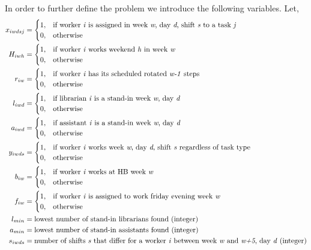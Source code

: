 In order to further define the problem we introduce the following variables. Let,
\begin{align}
    x_{iwdsj}&=
    \begin{cases}
      1, & \text{if worker \textit{i} is assigned in week \textit{w}, day \textit{d}, shift \textit{s} to a task \textit{j}}\\
      0, & \text{otherwise}
    \end{cases}
    \\
    H_{iwh}&=
    \begin{cases}
      1, & \text{if worker \textit{i} works weekend \textit{h} in week \textit{w}}\\
      0, & \text{otherwise}
    \end{cases}
	\\
	r_{iw}&=
	\begin{cases}
		1, & \text{if worker \textit{i} has its scheduled rotated \textit{w-1} steps}\\
		0, & \text{otherwise}
	\end{cases}
	\\
	l_{iwd}&=
	\begin{cases}
	  1, & \text{if librarian \textit{i} is a stand-in week \textit{w}, day \textit{d}} \\
	  0, & \text{otherwise}
	\end{cases}
	\\
	a_{iwd}&=
	\begin{cases}
 		1, & \text{if assistant \textit{i} is a stand-in week \textit{w}, day \textit{d}} \\
 		0, & \text{otherwise}
	\end{cases}
	\\
	y_{iwds}&=
	\begin{cases}
 		1, & \text{if worker \textit{i} works week \textit{w}, day \textit{d}, shift \textit{s} regardless of task type} \\
 		0, & \text{otherwise}
	\end{cases}
	\\
	b_{iw}&=
	\begin{cases}
 		1, & \text{if worker \textit{i} works at HB week \textit{w}} \\
 		0, & \text{otherwise}
	\end{cases}
	\\
	f_{iw}&=
	\begin{cases}
 		1, & \text{if worker \textit{i} is assigned to work friday evening week \textit{w}} \\
 		0, & \text{otherwise}
	\end{cases}	
	\\
	l_{min}&= \text{lowest number of stand-in librarians found (integer)} \\
	a_{min}&= \text{lowest number of stand-in assistants found (integer)} \\
	s_{iwds}&= \text{number of shifts \textit{s} that differ for a worker \textit{i} between week \textit{w} and \textit{w+5}, day \textit{d} (integer)}
\end{align}

